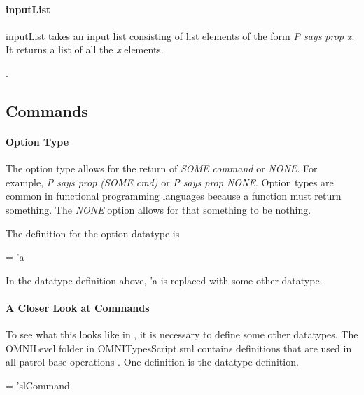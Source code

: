 \documentclass[../../main/main.tex]{subfiles}
\begin{document}
\HOLssmTheoremsextractInputXXdef


\paragraph*{inputList}
inputList takes an input list consisting of list elements of the form \textit{P says prop x}.  It returns a list of all the \textit{x} elements.
\begin{tabbing}
\parskip=8pt
\HOLTokenTurnstile{} \HOLSymConst{\HOLTokenForall{}}. \\
\hspace{0.3cm}   \HOLSymConst{=}   
\parskip=18pt
\end{tabbing}


\subsection{Commands}
\paragraph*{Option Type}\label{option}
The option type allows for the return of \textit{SOME command} or \textit{NONE}.  For example, \textit{P says prop (SOME cmd)} or \textit{P says prop NONE}.  Option types are common in functional programming languages because a function must return something.  The \textit{NONE} option allows for that something to be nothing.


The definition for the option datatype is

 =  \HOLTokenBar{}  'a

In the datatype definition above, 'a is replaced with some other datatype.  

\paragraph*{A Closer Look at Commands}
To see what this looks like in , it is necessary to define some other datatypes. The OMNILevel folder in OMNITypesScript.sml contains definitions that are used in all patrol base operations . One definition is the  datatype definition.

\begin{tabbing}
 =   \HOLTokenBar{}  'slCommand
\end{tabbing}
\end{document}
